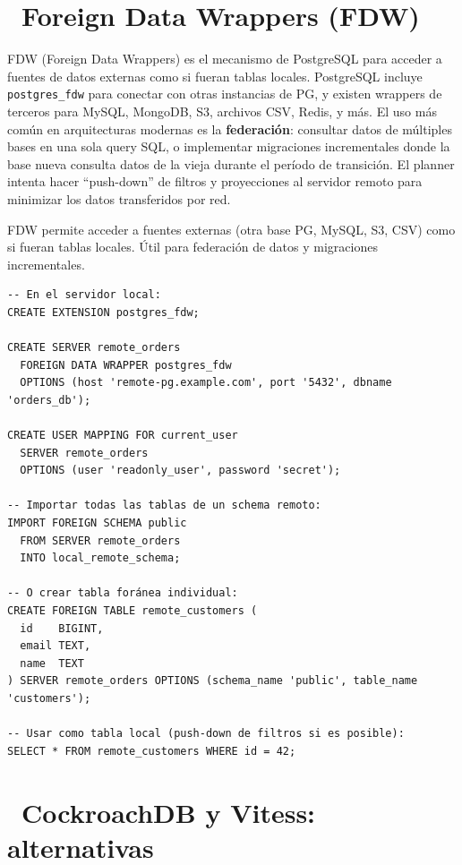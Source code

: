 \section[Foreign Data Wrappers (FDW)]{~Foreign Data Wrappers (FDW)}

FDW (Foreign Data Wrappers) es el mecanismo de PostgreSQL para acceder a fuentes de datos externas como si fueran tablas locales.
PostgreSQL incluye \texttt{postgres\_fdw} para conectar con otras instancias de PG, y existen wrappers de terceros para MySQL, MongoDB, S3, archivos CSV, Redis, y más.
El uso más común en arquitecturas modernas es la \textbf{federación}: consultar datos de múltiples bases en una sola query SQL, o implementar migraciones incrementales donde la base nueva consulta datos de la vieja durante el período de transición.
El planner intenta hacer ``push-down'' de filtros y proyecciones al servidor remoto para minimizar los datos transferidos por red.

FDW permite acceder a fuentes externas (otra base PG, MySQL, S3, CSV) como si fueran tablas locales.
Útil para federación de datos y migraciones incrementales.

\begin{lstlisting}[caption={postgres\_fdw — acceso a otra base PG}]
-- En el servidor local:
CREATE EXTENSION postgres_fdw;

CREATE SERVER remote_orders
  FOREIGN DATA WRAPPER postgres_fdw
  OPTIONS (host 'remote-pg.example.com', port '5432', dbname 'orders_db');

CREATE USER MAPPING FOR current_user
  SERVER remote_orders
  OPTIONS (user 'readonly_user', password 'secret');

-- Importar todas las tablas de un schema remoto:
IMPORT FOREIGN SCHEMA public
  FROM SERVER remote_orders
  INTO local_remote_schema;

-- O crear tabla foránea individual:
CREATE FOREIGN TABLE remote_customers (
  id    BIGINT,
  email TEXT,
  name  TEXT
) SERVER remote_orders OPTIONS (schema_name 'public', table_name 'customers');

-- Usar como tabla local (push-down de filtros si es posible):
SELECT * FROM remote_customers WHERE id = 42;
\end{lstlisting}

\section[CockroachDB y Vitess: alternativas]{~CockroachDB y Vitess: alternativas}


